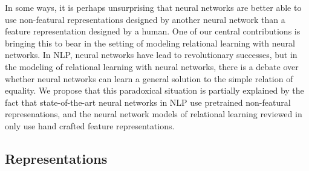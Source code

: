 \documentclass{article}
\begin{document}
{In some ways, it is perhaps unsurprising that neural networks are better able to use non-featural representations designed by another neural network than a feature representation designed by a human. One of our central contributions is bringing this to bear in the setting of modeling relational learning with neural networks. In NLP, neural networks have lead to revolutionary successes, but in the modeling of relational learning with neural networks, there is a debate over whether neural networks can learn a general solution to the simple relation of equality. We propose that this paradoxical situation is partially explained by the fact that state-of-the-art neural networks in NLP use pretrained non-featural represenations, and the neural network models of relational learning reviewed in \citep{alhama:2019} only use hand crafted feature representations.


\subsection{Representations}\label{sec:representations}

\newcommand{\mysquare}{
  \begin{tikzpicture}[scale=0.5]
    \node[rectangle, fill=red!100, minimum height=3mm, minimum width=3mm]{};
  \end{tikzpicture}}

\newcommand{\bluetriangle}{

  \begin{tikzpicture}[scale=0.25]
    \node[regular polygon,regular polygon sides=3, fill=blue!100, inner sep=2pt]{};
  \end{tikzpicture}}
\newcommand{\redtriangle}{
  \begin{tikzpicture}[scale=0.5]
    \node[regular polygon,regular polygon sides=3, fill=red!100, inner sep=2pt]{};
  \end{tikzpicture}}
\newcommand{\bluesquare}{
  \begin{tikzpicture}[scale=0.5]
    \node[regular polygon,regular polygon sides=4, fill=blue!100, minimum height=3mm, minimum width=3mm]{};
  \end{tikzpicture}}
\newcommand{\redsquare}{
  \begin{tikzpicture}[scale=0.5]
    \node[regular polygon,regular polygon sides=4, fill=red!100, minimum height=3mm, minimum width=3mm]{};
  \end{tikzpicture}}
\newcommand{\bluepentagon}{
  \begin{tikzpicture}[scale=0.5]
    \node[regular polygon,regular polygon sides=5, fill=blue!100, minimum height=3mm, minimum width=3mm]{};
  \end{tikzpicture}}
\newcommand{\redpentagon}{
  \begin{tikzpicture}[scale=0.5]
    \node[regular polygon,regular polygon sides=5, fill=red!100, minimum height=3mm, minimum width=3mm]{};
  \end{tikzpicture}}

}
\end{document}
